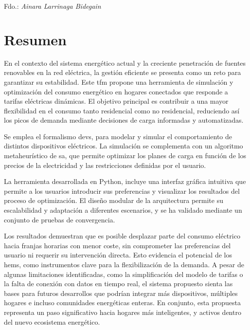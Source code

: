 \documentclass[11pt,a4paper]{book}
\begin{document}
Fdo.: \textit{Ainara Larrinaga Bidegain}
\vspace{2cm}

\clearpage

\chapter*{Resumen}
En el contexto del sistema energético actual y la creciente penetración de fuentes renovables en la red eléctrica, la gestión eficiente se presenta como un reto para garantizar su estabilidad. Este \gls{tfm} propone una herramienta de simulación y optimización del consumo energético en hogares conectados que responde a tarifas eléctricas dinámicas. El objetivo principal es contribuir a una mayor flexibilidad en el consumo tanto residencial como no residencial, reduciendo así los picos de demanda mediante decisiones de carga informadas y automatizadas.

Se emplea el formalismo \gls{devs}, para modelar y simular el comportamiento de distintos dispositivos eléctricos. La \mbox{simulación} se complementa con un algoritmo metaheurístico de \gls{sa}, que permite optimizar los planes de carga en función de los precios de la electricidad y las restricciones definidas por el usuario.

La herramienta desarrollada en Python, incluye una interfaz gráfica intuitiva que permite a los usuarios introducir sus preferencias y visualizar los resultados del proceso de optimización. El diseño modular de la arquitectura permite su escalabilidad y adaptación a diferentes escenarios, y se ha validado mediante un conjunto de pruebas de convergencia.

Los resultados demuestran que es posible desplazar parte del consumo eléctrico hacia franjas horarias con menor coste, sin comprometer las preferencias del usuario ni requerir su intervención directa. Esto evidencia el potencial de los \gls{hems}, como instrumentos clave para la flexibilización de la demanda. A pesar de algunas limitaciones identificadas, como la simplificación del modelo de tarifas o la falta de conexión con datos en tiempo real, el sistema propuesto sienta las bases para futuros desarrollos que podrían integrar más dispositivos, múltiples hogares e incluso comunidades energéticas enteras. En conjunto, esta propuesta representa un paso significativo hacia hogares más inteligentes, y activos dentro del nuevo ecosistema energético.

\vspace{1cm}
\end{document}
